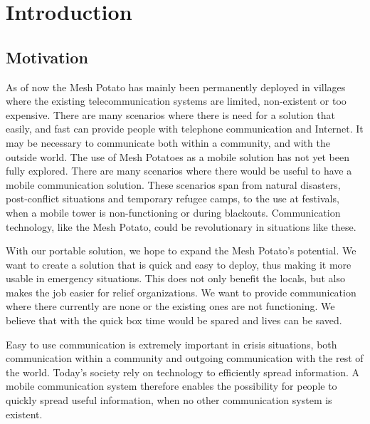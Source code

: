 \chapter{Introduction}
\label{chp:introduction} 

\section{Motivation}
As of now the Mesh Potato has mainly been permanently deployed in villages where the existing telecommunication systems are limited, non-existent or too expensive. There are many scenarios where there is need for a solution that easily, and fast can provide people with telephone communication and Internet. It may be necessary to communicate both within a community, and with the outside world. The use of Mesh Potatoes as a mobile solution has not yet been fully explored. There are many scenarios where there would be useful to have a mobile communication solution. These scenarios span from natural disasters, post-conflict situations and temporary refugee camps, to the use at festivals, when a mobile tower is non-functioning or during blackouts. Communication technology, like the Mesh Potato, could be revolutionary in situations like these. 

With our portable solution, we hope to expand the Mesh Potato's potential. We want to create a solution that is quick and easy to deploy, thus making it more usable in emergency situations. This does not only benefit the locals, but also makes the job easier for relief organizations. We want to provide communication where there currently are none or the existing ones are not functioning. We believe that with the \gls{quick} box time would be spared and lives can be saved. 

Easy to use communication is extremely important in crisis situations, both communication within a community and outgoing communication with the rest of the world. Today's society rely on technology to efficiently spread information. A mobile communication system therefore enables the possibility for people to quickly spread useful information, when no other communication system is existent. 


